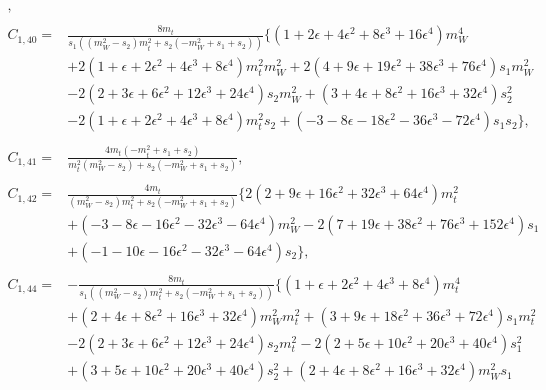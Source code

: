 \documentclass[twocolumn,aps,showpacs,nofootinbib,superscriptaddress,prd]{revtex4-2}
\begin{document}
\begin{widetext}
\begin{align}
,\nonumber\\
\nonumber\\
C_{1,40}=&\frac{8m_t}{s_1\left(\left(m_W^2-s_2\right)m_t^2+s_2\left(-m_W^2+s_1+s_2\right)\right)}\{\left(1 +2 \epsilon +4 \epsilon^2 +8 \epsilon^3 +16 \epsilon^4\right)m_W^4
\nonumber\\&
+2\left(1 +\epsilon +2 \epsilon^2 +4 \epsilon^3 +8 \epsilon^4\right)m_t^2m_W^2+2\left(4 +9 \epsilon +19 \epsilon^2 +38 \epsilon^3 +76 \epsilon^4\right)s_1m_W^2
\nonumber\\&
-2\left(2 +3 \epsilon +6 \epsilon^2 +12 \epsilon^3 +24 \epsilon^4\right)s_2m_W^2+\left(3 +4 \epsilon +8 \epsilon^2 +16 \epsilon^3 +32 \epsilon^4\right)s_2^2
\nonumber\\&
-2\left(1 +\epsilon +2 \epsilon^2 +4 \epsilon^3 +8 \epsilon^4\right)m_t^2s_2+\left(-3 -8 \epsilon -18 \epsilon^2 -36 \epsilon^3 -72 \epsilon^4\right)s_1s_2\}
,\nonumber\\
\nonumber\\
C_{1,41}=&\frac{4m_t\left(-m_t^2+s_1+s_2\right)}{m_t^2\left(m_W^2-s_2\right)+s_2\left(-m_W^2+s_1+s_2\right)}
,\nonumber\\
\nonumber\\
C_{1,42}=&\frac{4m_t}{\left(m_W^2-s_2\right)m_t^2+s_2\left(-m_W^2+s_1+s_2\right)}\{2\left(2 +9 \epsilon +16 \epsilon^2 +32 \epsilon^3 +64 \epsilon^4\right)m_t^2
\nonumber\\&
+\left(-3 -8 \epsilon -16 \epsilon^2 -32 \epsilon^3 -64 \epsilon^4\right)m_W^2-2\left(7 +19 \epsilon +38 \epsilon^2 +76 \epsilon^3 +152 \epsilon^4\right)s_1
\nonumber\\&
+\left(-1 -10 \epsilon -16 \epsilon^2 -32 \epsilon^3 -64 \epsilon^4\right)s_2\}
,\nonumber\\
\nonumber\\
C_{1,44}=&-\frac{8m_t}{s_1\left(\left(m_W^2-s_2\right)m_t^2+s_2\left(-m_W^2+s_1+s_2\right)\right)}\{\left(1 +\epsilon +2 \epsilon^2 +4 \epsilon^3 +8 \epsilon^4\right)m_t^4
\nonumber\\&
+\left(2 +4 \epsilon +8 \epsilon^2 +16 \epsilon^3 +32 \epsilon^4\right)m_W^2m_t^2+\left(3 +9 \epsilon +18 \epsilon^2 +36 \epsilon^3 +72 \epsilon^4\right)s_1m_t^2
\nonumber\\&
-2\left(2 +3 \epsilon +6 \epsilon^2 +12 \epsilon^3 +24 \epsilon^4\right)s_2m_t^2-2\left(2 +5 \epsilon +10 \epsilon^2 +20 \epsilon^3 +40 \epsilon^4\right)s_1^2
\nonumber\\&
+\left(3 +5 \epsilon +10 \epsilon^2 +20 \epsilon^3 +40 \epsilon^4\right)s_2^2+\left(2 +4 \epsilon +8 \epsilon^2 +16 \epsilon^3 +32 \epsilon^4\right)m_W^2s_1

\end{align}
\end{widetext}
\end{document}
